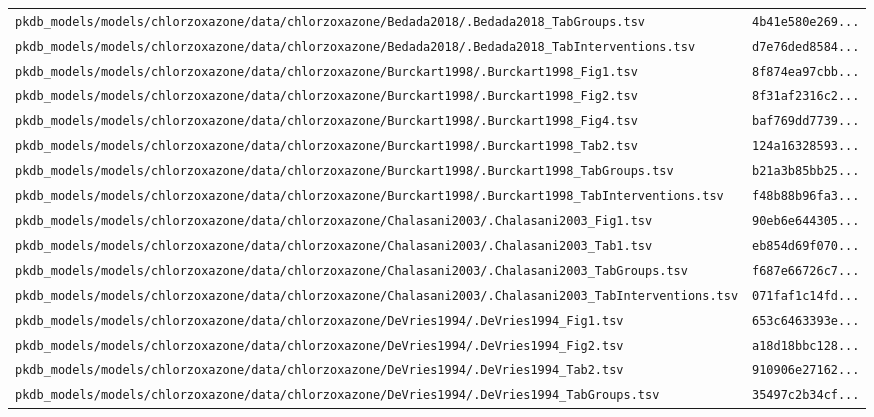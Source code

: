 \begin{longtable}{ll}
\texttt{pkdb\_models/models/chlorzoxazone/data/chlorzoxazone/Bedada2018/.Bedada2018\_TabGroups.tsv} & \texttt{4b41e580e269...} \\
\texttt{pkdb\_models/models/chlorzoxazone/data/chlorzoxazone/Bedada2018/.Bedada2018\_TabInterventions.tsv} & \texttt{d7e76ded8584...} \\
\texttt{pkdb\_models/models/chlorzoxazone/data/chlorzoxazone/Burckart1998/.Burckart1998\_Fig1.tsv} & \texttt{8f874ea97cbb...} \\
\texttt{pkdb\_models/models/chlorzoxazone/data/chlorzoxazone/Burckart1998/.Burckart1998\_Fig2.tsv} & \texttt{8f31af2316c2...} \\
\texttt{pkdb\_models/models/chlorzoxazone/data/chlorzoxazone/Burckart1998/.Burckart1998\_Fig4.tsv} & \texttt{baf769dd7739...} \\
\texttt{pkdb\_models/models/chlorzoxazone/data/chlorzoxazone/Burckart1998/.Burckart1998\_Tab2.tsv} & \texttt{124a16328593...} \\
\texttt{pkdb\_models/models/chlorzoxazone/data/chlorzoxazone/Burckart1998/.Burckart1998\_TabGroups.tsv} & \texttt{b21a3b85bb25...} \\
\texttt{pkdb\_models/models/chlorzoxazone/data/chlorzoxazone/Burckart1998/.Burckart1998\_TabInterventions.tsv} & \texttt{f48b88b96fa3...} \\
\texttt{pkdb\_models/models/chlorzoxazone/data/chlorzoxazone/Chalasani2003/.Chalasani2003\_Fig1.tsv} & \texttt{90eb6e644305...} \\
\texttt{pkdb\_models/models/chlorzoxazone/data/chlorzoxazone/Chalasani2003/.Chalasani2003\_Tab1.tsv} & \texttt{eb854d69f070...} \\
\texttt{pkdb\_models/models/chlorzoxazone/data/chlorzoxazone/Chalasani2003/.Chalasani2003\_TabGroups.tsv} & \texttt{f687e66726c7...} \\
\texttt{pkdb\_models/models/chlorzoxazone/data/chlorzoxazone/Chalasani2003/.Chalasani2003\_TabInterventions.tsv} & \texttt{071faf1c14fd...} \\
\texttt{pkdb\_models/models/chlorzoxazone/data/chlorzoxazone/DeVries1994/.DeVries1994\_Fig1.tsv} & \texttt{653c6463393e...} \\
\texttt{pkdb\_models/models/chlorzoxazone/data/chlorzoxazone/DeVries1994/.DeVries1994\_Fig2.tsv} & \texttt{a18d18bbc128...} \\
\texttt{pkdb\_models/models/chlorzoxazone/data/chlorzoxazone/DeVries1994/.DeVries1994\_Tab2.tsv} & \texttt{910906e27162...} \\
\texttt{pkdb\_models/models/chlorzoxazone/data/chlorzoxazone/DeVries1994/.DeVries1994\_TabGroups.tsv} & \texttt{35497c2b34cf...} \\

\end{longtable}
